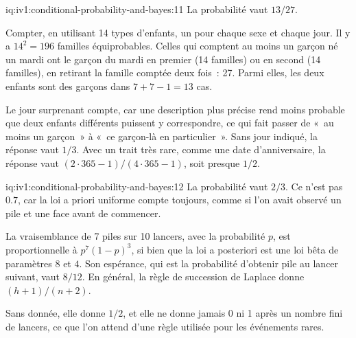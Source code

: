 \begin{solution}{iq:iv1:conditional-probability-and-bayes:11}
La probabilité vaut $13/27$.

Compter, en utilisant 14 types d'enfants, un pour chaque sexe et chaque jour. Il y a $14^2 = 196$ familles équiprobables. Celles qui comptent au moins un garçon né un mardi ont le garçon du mardi en premier (14 familles) ou en second (14 familles), en retirant la famille comptée deux fois~: 27. Parmi elles, les deux enfants sont des garçons dans $7 + 7 - 1 = 13$ cas.

Le jour surprenant compte, car une description plus précise rend moins probable que deux enfants différents puissent y correspondre, ce qui fait passer de «~au moins un garçon~» à «~ce garçon-là en particulier~». Sans jour indiqué, la réponse vaut $1/3$. Avec un trait très rare, comme une date d'anniversaire, la réponse vaut $(2 \cdot 365 - 1)/(4 \cdot 365 - 1)$, soit presque $1/2$.

\end{solution}

\begin{solution}{iq:iv1:conditional-probability-and-bayes:12}
La probabilité vaut $2/3$. Ce n'est pas $0.7$, car la loi a priori uniforme compte toujours, comme si l'on avait observé un pile et une face avant de commencer.

La vraisemblance de 7 piles sur 10 lancers, avec la probabilité $p$, est proportionnelle à $p^7(1 - p)^3$, si bien que la loi a posteriori est une loi bêta de paramètres $8$ et $4$. Son espérance, qui est la probabilité d'obtenir pile au lancer suivant, vaut $8/12$. En général, la règle de succession de Laplace donne $(h + 1)/(n + 2)$.

Sans donnée, elle donne $1/2$, et elle ne donne jamais 0 ni 1 après un nombre fini de lancers, ce que l'on attend d'une règle utilisée pour les événements rares.

\end{solution}

